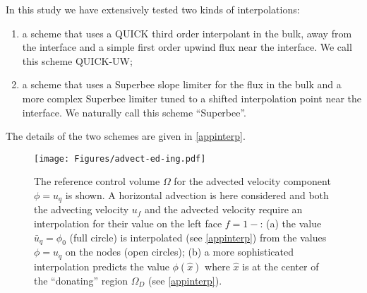 In this study we have extensively tested two kinds of interpolations:
\begin{enumerate}
\item a scheme that uses a QUICK third order interpolant in the bulk, away from the interface 
and a simple first order upwind flux near the interface. We call this scheme QUICK-UW;
\item a scheme that uses a Superbee slope limiter \cite{roe1985some} for the flux in the 
bulk and a more complex Superbee limiter tuned to a shifted interpolation point near the 
interface.  We naturally call this scheme ``Superbee''. 
\end{enumerate}
The details of the two schemes are given in \ref{appinterp}.
\begin{figure}
\begin{center}
    \texttt{[image: Figures/advect-ed-ing.pdf]}
\end{center}
\caption{The reference control volume $\Omega$ for the advected velocity component 
$\phi=u_q$ is shown. A horizontal advection is here considered and both the advecting velocity 
$u_f$ and the advected velocity require an interpolation for their value on the left face 
$f=1-$: (a) the value $\bar u_q = \phi_0$ (full circle) is interpolated 
(see \ref{appinterp}) from the values $\phi=u_q$ on the nodes (open circles);
(b) a more sophisticated interpolation predicts the value $\phi(\hat x)$ where $\hat x$ is
at the center of the ``donating'' region $\Omega_D$ (see \ref{appinterp}).}
\label{advect-ed-ing-fig}
\end{figure}
\label{tunedinter}

